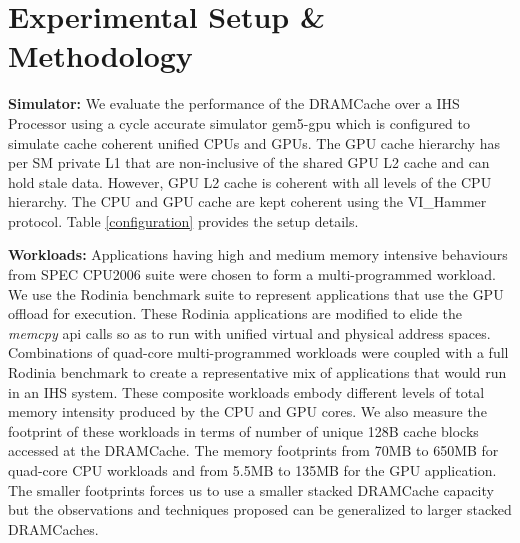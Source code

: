\section{Experimental Setup \& Methodology} \label{methodology}
\par \textbf{Simulator:} We evaluate the performance of the DRAMCache over a IHS Processor using a cycle accurate simulator gem5-gpu \cite{gem5-gpu} which is configured to simulate cache coherent unified CPUs and GPUs. The GPU cache hierarchy has per SM private L1  that are non-inclusive of the shared GPU L2 cache and can hold stale data. However, GPU L2 cache is coherent with all levels of the CPU hierarchy. The CPU and GPU cache are kept coherent using the VI\_Hammer protocol. Table \ref{configuration} provides the setup details.\\
\par \textbf{Workloads:} Applications having high and medium memory intensive behaviours from SPEC CPU2006 suite \cite{spec2006} were chosen to form a multi-programmed workload. We use the Rodinia benchmark suite \cite{rodinia} to represent applications that use the GPU offload for execution. These Rodinia applications are modified to elide the \textit{memcpy} api calls so as to run with unified virtual and physical address spaces. Combinations of quad-core multi-programmed workloads were coupled with a full Rodinia benchmark to create a representative mix of applications that would run in an IHS system. These composite workloads embody different levels of total memory intensity produced by the CPU and GPU cores. We also measure the footprint of these workloads in terms of number of unique 128B cache blocks accessed at the DRAMCache. The memory footprints from 70MB to 650MB for quad-core CPU workloads and from 5.5MB to 135MB for the GPU application. The smaller footprints forces us to use a smaller stacked DRAMCache capacity but the observations and techniques proposed can be generalized to larger stacked DRAMCaches.\\
